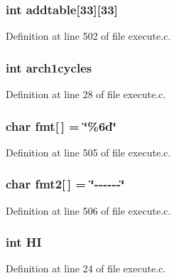 \subsubsection[{addtable}]{\setlength{\rightskip}{0pt plus 5cm}int addtable[33][33]}\label{execute_8c_a7f80cc52aa264733a59f1421360a3d7f}


Definition at line 502 of file execute.\+c.

\subsubsection[{arch1cycles}]{\setlength{\rightskip}{0pt plus 5cm}int arch1cycles}\label{execute_8c_a23f86f71a5c66c42cd4b624e3b9f3c94}


Definition at line 28 of file execute.\+c.

\subsubsection[{fmt}]{\setlength{\rightskip}{0pt plus 5cm}char fmt[$\,$] = \char`\"{}\%6d\char`\"{}}\label{execute_8c_a37908304d58bcfde34d7dc6f498591f5}


Definition at line 505 of file execute.\+c.

\subsubsection[{fmt2}]{\setlength{\rightskip}{0pt plus 5cm}char fmt2[$\,$] = \char`\"{}-\/-\/-\/-\/-\/-\/\char`\"{}}\label{execute_8c_a61e44204967f2d32f52c318d7ae484ec}


Definition at line 506 of file execute.\+c.

\subsubsection[{HI}]{\setlength{\rightskip}{0pt plus 5cm}int HI}\label{execute_8c_a4692891afb0af53a0c9488c0f8cfc708}


Definition at line 24 of file execute.\+c.

